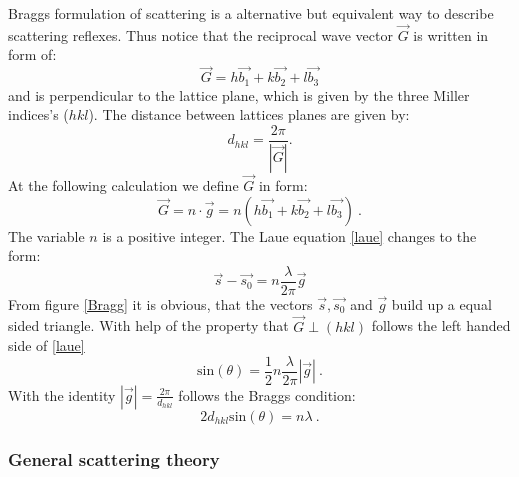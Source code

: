 	Braggs formulation of scattering is a alternative but equivalent way to describe scattering reflexes. Thus notice that the reciprocal wave vector $\vec G$ is written in form of:
	\begin{equation}
		\vec G= h\vec{b_1}+k\vec{b_2}+l\vec{b_3}
	\end{equation}
	and is perpendicular to the lattice plane, which is given by the three Miller indices's ($hkl$). The distance between lattices planes are given by:
	\begin{equation}
		d_{hkl}=\frac{2\pi}{|\vec{G}|}.
	\end{equation}
	At the following calculation we define $\vec G$ in form:
	\begin{equation}
		\vec G = n \cdot \vec g = n(h\vec{b_1}+k\vec{b_2}+l\vec{b_3})~\mathrm{.}
	\end{equation}
	The variable $n$ is a positive integer. The Laue equation \ref{laue} changes to the form:
	\begin{equation}
		\vec{s}-\vec{s_0}=n \frac{\lambda}{2 \pi}\vec g
	\end{equation}
	From figure \ref{Bragg}	it is obvious, that the vectors $\vec s,\vec{s_0}$ and $\vec g$ build up a equal sided triangle. With help of the property that $\vec{G} \perp (hkl)$ follows the left handed side of \ref{laue}
	\begin{equation}
		\mathrm{sin}(\theta)=\frac{1}{2} n \frac{\lambda}{2\pi}|\vec g|~\mathrm{.}
	\end{equation}
	With the identity $|\vec g|= \frac{2\pi}{d_{hkl}}$ follows the Braggs condition:
	\begin{equation}
		2d_{hkl} \mathrm{sin}(\theta)=n \lambda~\mathrm{.}
	\end{equation}
	
	\subsubsection{General scattering theory}
	
